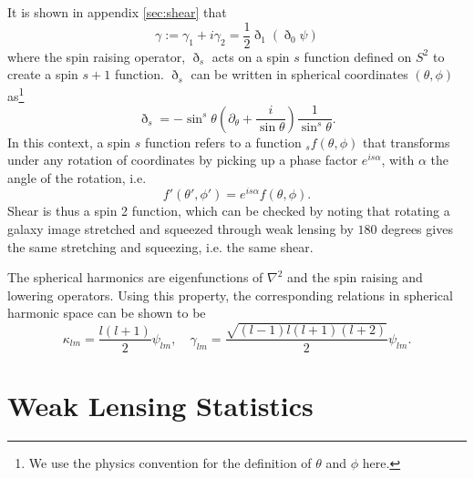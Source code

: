 \documentclass[11pt]{article} %
\begin{document}
It is shown in appendix \ref{sec:shear} that
\begin{equation}
    \gamma := \gamma_1 + i\gamma_2 = \frac{1}{2}\eth_1(\eth_0\psi)
\end{equation}
where the spin raising operator, $\eth_s$ acts on a spin $s$ function defined on $S^2$ to create a spin $s+1$ function.
$\eth_s$ can be written in spherical coordinates $(\theta, \phi)$ as\footnote{We use the physics convention for the definition of $\theta$ and $\phi$ here.}
\begin{equation}
    \eth_s = -\sin^s\theta(\partial_\theta + \frac{i}{\sin\theta})\frac{1}{\sin^s\theta}.
\end{equation}
In this context, a spin $s$ function refers to a function $_sf(\theta, \phi)$ that transforms under any rotation of coordinates by picking up a phase factor $e^{is\alpha}$, with $\alpha$ the angle of the rotation, i.e.
\begin{equation}
    f'(\theta', \phi') = e^{is\alpha}f(\theta, \phi).
\end{equation}
Shear is thus a spin 2 function, which can be checked by noting that rotating a galaxy image stretched and squeezed through weak lensing by $180$ degrees gives the same stretching and squeezing, i.e. the same shear.

The spherical harmonics are eigenfunctions of $\nabla^2$ and the spin raising and lowering operators. Using this property, the corresponding relations in spherical harmonic space can be shown to be 
\begin{equation*}
    \kappa_{lm} = \frac{l(l+1)}{2}\psi_{lm}, \quad \gamma_{lm} = \frac{\sqrt{(l-1)l(l+1)(l+2)}}{2} \psi_{lm}.
\end{equation*}

\section{Weak Lensing Statistics}\label{sec:weaklensstats}
\end{document}
